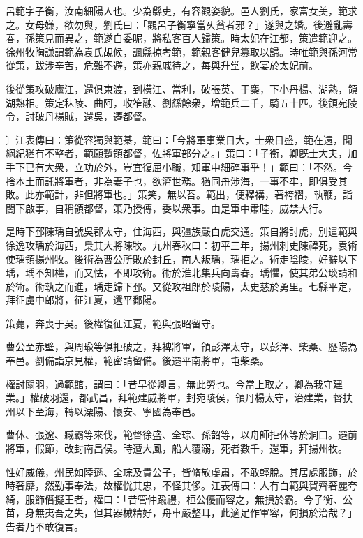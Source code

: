 
\begin{pinyinscope}
呂範字子衡，汝南細陽人也。少為縣吏，有容觀姿貌。邑人劉氏，家富女美，範求之。女母嫌，欲勿與，劉氏曰：「觀呂子衡寧當乆貧者邪？」遂與之婚。後避亂壽春，孫策見而異之，範遂自委昵，將私客百人歸策。時太妃在江都，策遣範迎之。徐州牧陶謙謂範為袁氏覘候，諷縣掠考範，範親客健兒篡取以歸。時唯範與孫河常從策，跋涉辛苦，危難不避，策亦親戚待之，每與升堂，飲宴於太妃前。

後從策攻破廬江，還俱東渡，到橫江、當利，破張英、于麋，下小丹楊、湖熟，領湖熟相。策定秣陵、曲阿，收笮融、劉繇餘衆，增範兵二千，騎五十匹。後領宛陵令，討破丹楊賊，還吳，遷都督。

〕江表傳曰：策從容獨與範棊，範曰：「今將軍事業日大，士衆日盛，範在遠，聞綱紀猶有不整者，範願蹔領都督，佐將軍部分之。」策曰：「子衡，卿旣士大夫，加手下已有大衆，立功於外，豈宜復屈小職，知軍中細碎事乎！」範曰：「不然。今捨本土而託將軍者，非為妻子也，欲濟世務。猶同舟涉海，一事不牢，即俱受其敗。此亦範計，非但將軍也。」策笑，無以荅。範出，便釋褠，著袴褶，執鞭，詣閤下啟事，自稱領都督，策乃授傳，委以衆事。由是軍中肅睦，威禁大行。

是時下邳陳瑀自號吳郡太守，住海西，與彊族嚴白虎交通。策自將討虎，別遣範與徐逸攻瑀於海西，梟其大將陳牧。九州春秋曰：初平三年，揚州刺史陳禕死，袁術使瑀領揚州牧。後術為曹公所敗於封丘，南人叛瑀，瑀拒之。術走陰陵，好辭以下瑀，瑀不知權，而又怯，不即攻術。術於淮北集兵向壽春。瑀懼，使其弟公琰請和於術。術執之而進，瑀走歸下邳。又從攻祖郎於陵陽，太史慈於勇里。七縣平定，拜征虜中郎將，征江夏，還平鄱陽。

策薨，奔喪于吳。後權復征江夏，範與張昭留守。

曹公至赤壁，與周瑜等俱拒破之，拜裨將軍，領彭澤太守，以彭澤、柴桑、歷陽為奉邑。劉備詣京見權，範密請留備。後遷平南將軍，屯柴桑。

權討關羽，過範館，謂曰：「昔早從卿言，無此勞也。今當上取之，卿為我守建業。」權破羽還，都武昌，拜範建威將軍，封宛陵侯，領丹楊太守，治建業，督扶州以下至海，轉以溧陽、懷安、寧國為奉邑。

曹休、張遼、臧霸等來伐，範督徐盛、全琮、孫韶等，以舟師拒休等於洞口。遷前將軍，假節，改封南昌侯。時遭大風，船人覆溺，死者數千，還軍，拜揚州牧。

性好威儀，州民如陸遜、全琮及貴公子，皆脩敬虔肅，不敢輕脫。其居處服飾，於時奢靡，然勤事奉法，故權恱其忠，不怪其侈。江表傳曰：人有白範與賀齊奢麗夸綺，服飾僭擬王者，權曰：「昔管仲踰禮，桓公優而容之，無損於霸。今子衡、公苗，身無夷吾之失，但其器械精好，舟車嚴整耳，此適足作軍容，何損於治哉？」告者乃不敢復言。


\end{pinyinscope}

